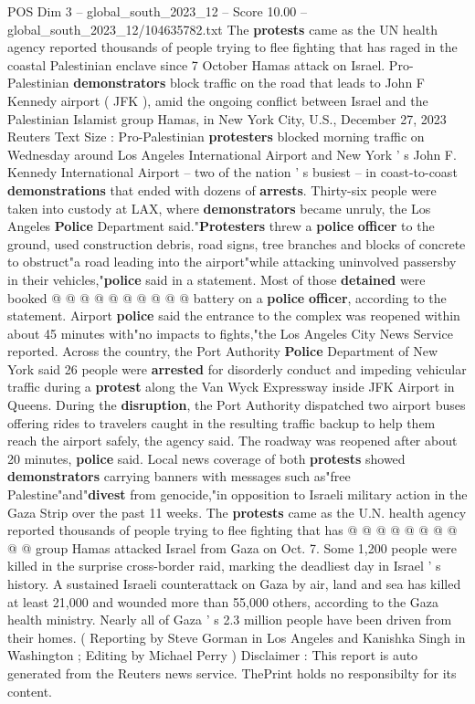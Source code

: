 \begin{textsample}{POS Dim 3 – global\_south\_2023\_12 – Score 10.00 – global\_south\_2023\_12/104635782.txt}  \label{ex:f3_pos_439}
The \textbf{protests} came as the UN health agency reported thousands of people trying to flee fighting that has raged in the coastal Palestinian enclave since 7 October Hamas attack on Israel.
Pro-Palestinian \textbf{demonstrators} block traffic on the road that leads to John F Kennedy airport ( JFK ), amid the ongoing conflict between Israel and the Palestinian Islamist group Hamas, in New York City, U.S., December 27, 2023 Reuters Text Size : Pro-Palestinian \textbf{protesters} blocked morning traffic on Wednesday around Los Angeles International Airport and New York ' s John F.
Kennedy International Airport -- two of the nation ' s busiest -- in coast-to-coast \textbf{demonstrations} that ended with dozens of \textbf{arrests}.
Thirty-six people were taken into custody at LAX, where \textbf{demonstrators} became unruly, the Los Angeles \textbf{Police} Department said."\textbf{Protesters} threw a \textbf{police} \textbf{officer} to the ground, used construction debris, road signs, tree branches and blocks of concrete to obstruct"a road leading into the airport"while attacking uninvolved passersby in their vehicles,"\textbf{police} said in a statement.
Most of those \textbf{detained} were booked @ @ @ @ @ @ @ @ @ @ battery on a \textbf{police} \textbf{officer}, according to the statement.
Airport \textbf{police} said the entrance to the complex was reopened within about 45 minutes with"no impacts to fights,"the Los Angeles City News Service reported.
Across the country, the Port Authority \textbf{Police} Department of New York said 26 people were \textbf{arrested} for disorderly conduct and impeding vehicular traffic during a \textbf{protest} along the Van Wyck Expressway inside JFK Airport in Queens.
During the \textbf{disruption}, the Port Authority dispatched two airport buses offering rides to travelers caught in the resulting traffic backup to help them reach the airport safely, the agency said.
The roadway was reopened after about 20 minutes, \textbf{police} said.
Local news coverage of both \textbf{protests} showed \textbf{demonstrators} carrying banners with messages such as"free Palestine"and"\textbf{divest} from genocide,"in opposition to Israeli military action in the Gaza Strip over the past 11 weeks.
The \textbf{protests} came as the U.N. health agency reported thousands of people trying to flee fighting that has @ @ @ @ @ @ @ @ @ @ group Hamas attacked Israel from Gaza on Oct. 7.
Some 1,200 people were killed in the surprise cross-border raid, marking the deadliest day in Israel ' s history.
A sustained Israeli counterattack on Gaza by air, land and sea has killed at least 21,000 and wounded more than 55,000 others, according to the Gaza health ministry.
Nearly all of Gaza ' s 2.3 million people have been driven from their homes. ( Reporting by Steve Gorman in Los Angeles and Kanishka Singh in Washington ; Editing by Michael Perry ) Disclaimer : This report is auto generated from the Reuters news service.
ThePrint holds no responsibilty for its content.

\end{textsample}
